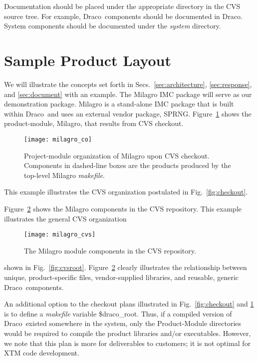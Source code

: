 \documentclass[note]{ResearchNote_pdf}
\newcommand{\draco}{\textsf{Draco}}
\newcommand{\pkg}[1]{\textsf{#1}}
\newcommand{\dir}[1]{\textsl{#1}}
\begin{document}
Documentation should  be placed under the appropriate directory in 
the CVS source tree.  For example, \draco\ components should be
documented in \draco.  \pkg{System} components should be documented
under the \dir{system} directory.


\section{Sample Product Layout}

We will illustrate the concepts set forth in
Secs.~\ref{sec:architecture}, \ref{sec:response}, and
\ref{sec:document} with an example.  The \pkg{Milagro} IMC package
will serve as our demonstration package.  \pkg{Milagro} is a
stand-alone IMC package that is built within \draco\ and uses an
external vendor package, \pkg{SPRNG}.  Figure~\ref{fig:milagro_co}
shows the product-module, \pkg{Milagro}, that results from CVS
checkout.
\begin{figure}
  \centerline{\texttt{[image: milagro\_co]}}
  \caption{Project-module organization of \pkg{Milagro} upon CVS
    checkout.  Components in dashed-line boxes are the products
    produced by the top-level \pkg{Milagro} \dir{makefile}.}
  \label{fig:milagro_co}
\end{figure}
This example illustrates the CVS organization postulated in
Fig.~\ref{fig:checkout}. 

Figure~\ref{fig:milagro_cvs} shows the \pkg{Milagro} components in the 
CVS repository.  This example illustrates the general CVS organization 
\begin{figure}
  \centerline{\texttt{[image: milagro\_cvs]}}
  \caption{The \pkg{Milagro} module components in the CVS repository.}
  \label{fig:milagro_cvs}
\end{figure}
shown in Fig.~\ref{fig:cvsroot}.  Figure~\ref{fig:milagro_cvs} clearly 
illustrates the relationship between unique, product-specific files,
vendor-supplied libraries, and reusable, generic \draco\ components.

An additional option to the checkout plans illustrated in
Fig.~\ref{fig:checkout} and \ref{fig:milagro_co} is to define a
\dir{makefile} variable \$draco\_root.  Thus, if a compiled version of
\draco\ existed somewhere in the system, only the \pkg{Product-Module}
directories would be required to compile the product libraries and/or
executables.  However, we note that this plan is more for deliverables
to customers; it is not optimal for XTM code development.
\end{document}
